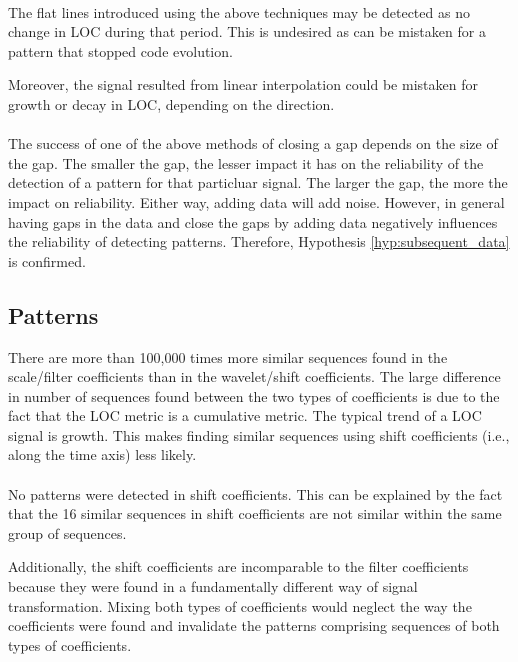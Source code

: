 \paragraph{}
The flat lines introduced using the above techniques may be detected as no
change in LOC during that period. This is undesired as can be mistaken for a
pattern that stopped code evolution.

Moreover, the signal resulted from linear interpolation could be mistaken for
growth or decay in LOC, depending on the direction.

\paragraph{}
The success of one of the above methods of closing a gap depends on the size of
the gap. The smaller the gap, the lesser impact it has on the reliability of
the detection of a pattern for that particluar signal. The larger the gap, the
more the impact on reliability. Either way, adding data will add noise.
However, in general having gaps in the data and close the gaps by adding data
negatively influences the reliability of detecting patterns. Therefore,
Hypothesis \ref{hyp:subsequent_data} is confirmed.

\subsection{Patterns}
\label{section:pattern_evaluation}
There are more than 100,000 times more similar sequences found in the
scale/filter coefficients than in the wavelet/shift coefficients. The large
difference in number of sequences found between the two types of coefficients
is due to the fact that the LOC metric is a cumulative metric. The typical
trend of a LOC signal is growth. This makes finding similar sequences using
shift coefficients (i.e., along the time axis) less likely.

\paragraph{}
No patterns were detected in shift coefficients. This can be explained by the
fact that the 16 similar sequences in shift coefficients are not similar within
the same group of sequences.

Additionally, the shift coefficients are incomparable to the filter coefficients
because they were found in a fundamentally different way of signal
transformation. Mixing both types of coefficients would neglect the way the
coefficients were found and invalidate the patterns comprising sequences of
both types of coefficients.


